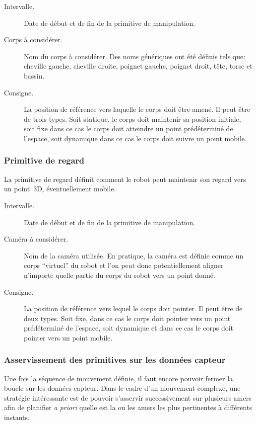 \begin{description}
\item[Intervalle.] Date de début et de fin de la primitive de manipulation.
\item[Corps à considérer.] Nom du corps à considérer. Des noms
  génériques ont été définis tels que: cheville gauche, cheville
  droite, poignet gauche, poignet droit, tête, torse et bassin.
\item[Consigne.] La position de référence vers laquelle le corps doit
  être amené. Il peut être de trois types. Soit statique, le corps
  doit maintenir sa position initiale, soit fixe dans ce cas le corps
  doit atteindre un point prédéterminé de l'espace, soit dynamique
  dans ce cas le corps doit suivre un point mobile.
\end{description}


\subsubsection{Primitive de regard}

La primitive de regard définit comment le robot peut maintenir son
regard vers un point 3D, éventuellement mobile.

\begin{description}
\item[Intervalle.] Date de début et de fin de la primitive de manipulation.
\item[Caméra à considérer.] Nom de la caméra utilisée. En pratique, la
  caméra est définie comme un corps ``virtuel'' du robot et l'on peut
  donc potentiellement aligner n'importe quelle partie du corps du
  robot vers un point donné.
\item[Consigne.] La position de référence vers lequel le corps doit
  pointer. Il peut être de deux types. Soit fixe, dans ce cas le corps
  doit pointer vers un point prédéterminé de l'espace, soit dynamique
  et dans ce cas le corps doit pointer vers un point mobile.
\end{description}


\subsubsection{Asservissement des primitives sur les données capteur}


Une fois la séquence de mouvement définie, il faut encore pouvoir
fermer la boucle sur les données capteur. Dans le cadre d'un mouvement
complexe, une stratégie intéressante est de pouvoir s'asservir
successivement sur plusieurs amers afin de planifier \emph{a priori}
quelle est la ou les amers les plus pertinentes à différents instants.



